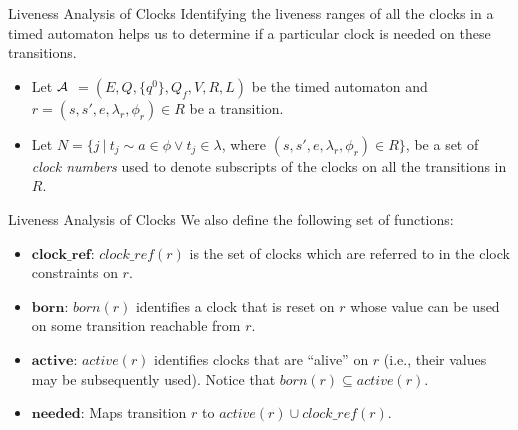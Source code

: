\documentclass[10pt]{beamer}
\theoremstyle{plain}
\theoremstyle{definition}
\newcommand*{\Var}[1]{\ensuremath{\mathit{#1}}}
\newcommand*{\Active}{\Var{active}}
\newcommand*{\Born}{\Var{born}}
\begin{document}
\begin{frame}{Liveness Analysis of Clocks}
Identifying the liveness ranges of all the clocks in a timed automaton helps us to  determine if a particular clock is needed on these transitions.
\begin{itemize}
	\item Let $\cal A$ $= (E, Q, \{q^0\}, Q_f, V, R, L)$ be the timed automaton and $r = (s, s', e, \lambda_r, \phi_r) \in R$ be a transition.
	\item Let $N = \{j~|~t_j\sim a \in \phi \vee t_j \in \lambda$, where $(s, s', e, \lambda_r, \phi_r) \in R\}$, be a set of \emph{clock numbers} used to denote subscripts of the clocks on all the transitions in $R$.
\end{itemize}
\end{frame}

\begin{frame}{Liveness Analysis of Clocks}
	We also define the following set of functions:%
	\begin{itemize}
		\item
		$\mathit{\textbf{clock\_ref}}$: $\mathit{clock\_ref(r)}$ is the set of clocks which are referred to in the clock constraints on $r$.
		\item
		$\textbf{born}$: $\Born(r)$ identifies a clock that is reset on $r$  whose value can be used on some transition	reachable from $r$.
		\item 
		$\textbf{active}$: $\Active(r)$ identifies clocks that are ``alive'' on $r$ (i.e., their  values may be subsequently used). Notice that $\Born(r)\subseteq \Active(r)$.
		\item
		$\textbf{needed}$: Maps transition $r$ to $\Active(r)\cup \mathit{clock\_ref(r)}$.
		
	\end{itemize}

\end{frame}
\end{document}
